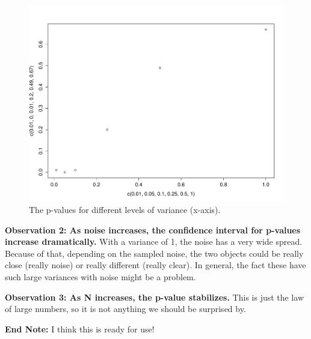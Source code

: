 \documentclass[a4paper]{article}
\begin{document}
\begin{figure}[htp!]
\centering
	\includegraphics[width=\linewidth]{sept29_5}
    \caption{The p-values for different levels of variance (x-axis). }
\end{figure}

\textbf{Observation 2: As noise increases, the confidence interval for p-values increase dramatically.} With a variance of 1, the noise has a very wide spread. Because of that, depending on the sampled noise, the two objects could be really close (really noise) or really different (really clear). In general, the fact these have such large variances with noise might be a problem.

\textbf{Observation 3: As N increases, the p-value stabilizes.} This is just the law of large numbers, so it is not anything we should be surprised by. 

\textbf{End Note:} I think this is ready for use! 
\end{document}
